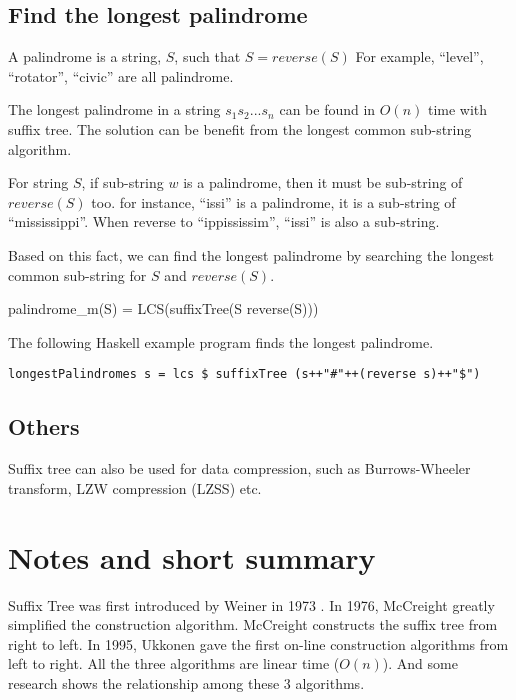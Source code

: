 \documentclass[UTF8]{article}
\begin{document}
\subsection{Find the longest palindrome}

A palindrome is a string, $S$, such that $S=reverse(S)$ For example,
``level'', ``rotator'', ``civic'' are all palindrome.

The longest palindrome in a string $s_1s_2...s_n$ can be found in
$O(n)$ time with suffix tree. The solution can be benefit from the
longest common sub-string algorithm.

For string $S$, if sub-string $w$ is a palindrome, then it must be
sub-string of $reverse(S)$ too. for instance, ``issi'' is a palindrome,
it is a sub-string of ``mississippi''. When reverse to
``ippississim'', ``issi'' is also a sub-string.

Based on this fact, we can find the longest palindrome by
searching the longest common sub-string for $S$ and $reverse(S)$.

\be
palindrome_m(S) = LCS(suffixTree(S \cup reverse(S)))
\ee

The following Haskell example program finds the longest palindrome.

\lstset{language=Haskell}
\begin{lstlisting}
longestPalindromes s = lcs $ suffixTree (s++"#"++(reverse s)++"$")
\end{lstlisting}

\subsection{Others}
Suffix tree can also be used for data compression, such as Burrows-Wheeler
transform, LZW compression (LZSS) etc. \cite{wiki-suffix-tree}

\section{Notes and short summary}

Suffix Tree was first introduced by Weiner in 1973 \cite{weiner}.
In 1976, McCreight greatly simplified the construction algorithm.
McCreight constructs the suffix tree from right to left. In 1995,
Ukkonen gave the first on-line construction algorithms from
left to right. All the three algorithms are linear time ($O(n)$).
And some research shows the relationship among these 3 algorithms.
\cite{GieKur97}
\end{document}
